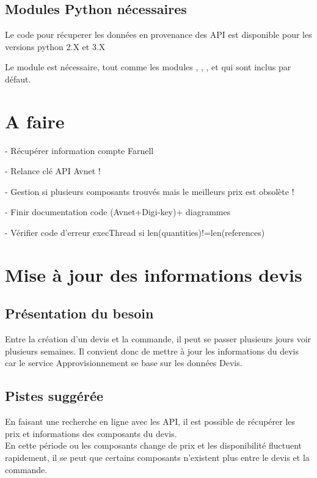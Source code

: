 {\section{Modules Python nécessaires}

Le code pour récuperer les données en provenance des API est disponible pour les versions python 2.X et 3.X

Le module  est nécessaire, tout comme les modules 
, , ,  et  qui sont inclus par défaut.

\chapter{A faire}


- Récupérer information compte Farnell 

- Relance clé API Avnet !

- Gestion si plusieurs composants trouvés mais le meilleurs prix est obsolète !

- Finir documentation code (Avnet+Digi-key)+ diagrammes

- Vérifier code d'erreur execThread si len(quantities)!=len(references)%

\chapter{Mise à jour des informations devis}

\section{Présentation du besoin}

Entre la création d'un devis et la commande, il peut se passer plusieurs jours voir plusieurs semaines. Il convient donc de mettre à jour les informations du devis car le service Approvisionnement se base sur les données Devis.

\section{Pistes suggérée}

En faisant une recherche en ligne avec les API, il est possible de récupérer les prix et informations des composants du devis.\\
En cette période ou les composants change de prix et les disponibilité fluctuent rapidement, il se peut que certains composants n'existent plus entre le devis et la commande.

}
